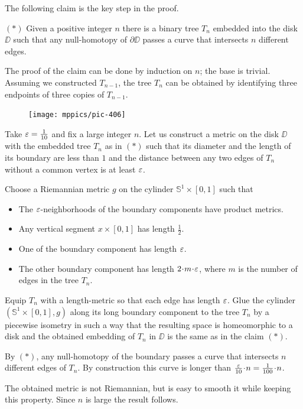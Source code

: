 The following claim is the key step in the proof.
\begin{cl}{$({*})$}
Given a positive integer $n$ there is a binary tree $T_n$ embedded into the disk $\DD$ such that any null-homotopy of $\partial \DD$ passes a curve that intersects $n$ different edges.
\end{cl}


The proof of the claim can be done by induction on $n$; the base is trivial.
Assuming we constructed $T_{n-1}$, the tree $T_n$ can be obtained by identifying three endpoints of three copies of $T_{n-1}$.

\begin{figure}[h!]
\vskip0mm
\centering
\texttt{[image: mppics/pic-406]}
\end{figure}

Take $\varepsilon=\tfrac1{10}$ and fix a large integer $n$.
Let us construct a metric on the disk $\DD$ with the embedded tree $T_n$ as in $({*})$ such that
its diameter and the length of its boundary are less than $1$
and  
the distance between any two edges of $T_n$ without a common vertex 
is at least $\varepsilon$.

Choose a Riemannian metric $g$ on the cylinder $\mathbb S^1\times [0,1]$ such that
\begin{itemize}
\item The $\varepsilon$-neighborhoods of the boundary components 
have product metrics.
\item Any vertical segment $x\times[0,1]$ has length $\tfrac 12$.
\item One of the boundary component has length $\varepsilon$.
\item The other boundary component has length $2\cdot m\cdot \eps$, 
where $m$ is the number of edges in the tree $T_n$.
\end{itemize}
Equip $T_n$ with a length-metric so that each edge has length $\varepsilon$.
Glue the cylinder $(\mathbb S^1\times [0,1],g)$ along its long boundary component to the tree $T_n$ by a piecewise isometry 
in such a way that the resulting space is homeomorphic to a disk and the obtained embedding of $T_n$ in $\DD$ is the same as in the claim $({*})$.

By $({*})$, any null-homotopy of the boundary passes a curve that intersects $n$ different edges of $T_n$.
By construction this curve is longer than $\tfrac{\eps}{10}\cdot n=\tfrac{1}{100}\cdot n$.

The obtained metric is not Riemannian, but is easy to smooth it while keeping this property.
Since $n$ is large the result follows.
\qeds
 
